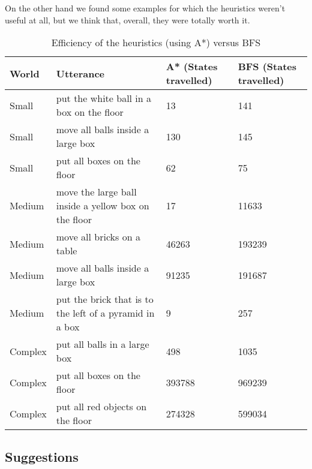 \documentclass[11pt]{article}
\begin{document}
        On the other hand we found some examples for which the heuristics weren't useful at all, 
        but we think that, overall, they were totally worth it.

\begin{table*}[t]
    \begin{tabular}{|l|l|l|l|}
    \hline
    World   & Utterance                                               & A* (States travelled) & BFS (States travelled) \\ \hline
    Small   & put the white ball in a box on the floor                & 13                    & 141                    \\ \hline
    Small   & move all balls inside a large box                       & 130                   & 145                    \\ \hline
    Small   & put all boxes on the floor                              & 62                    & 75                     \\ \hline
    Medium  & move the large ball inside a yellow box on the floor    & 17                    & 11633                  \\ \hline
    Medium  & move all bricks on a table                              & 46263                 & 193239                 \\ \hline
    Medium  & move all balls inside a large box                       & 91235                 & 191687                 \\ \hline
    Medium  & put the brick that is to the left of a pyramid in a box & 9                     & 257                    \\ \hline
    Complex & put all balls in a large box                            & 498                   & 1035                   \\ \hline
    Complex & put all boxes on the floor                              & 393788                & 969239                 \\ \hline
    Complex & put all red objects on the floor                        & 274328                & 599034                 \\ \hline
    \end{tabular}
    \caption{Efficiency of the heuristics (using A*) versus BFS}
    \label{table}
\end{table*}
        \subsection{Suggestions}
\end{document}
